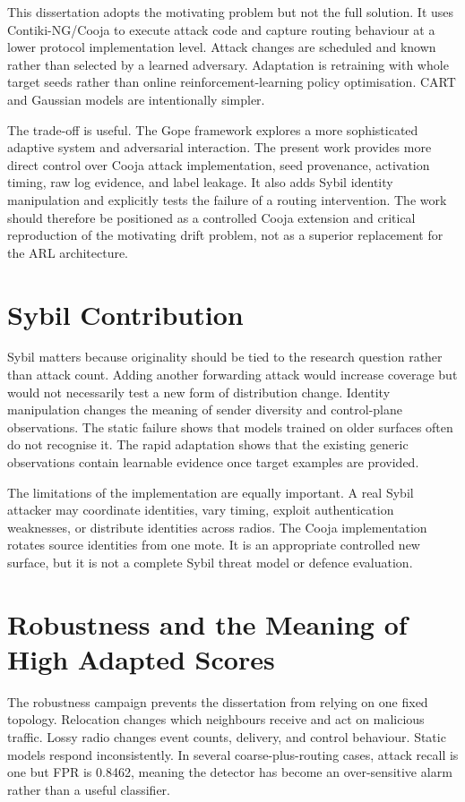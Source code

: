 This dissertation adopts the motivating problem but not the full solution. It uses Contiki-NG/Cooja to execute attack code and capture routing behaviour at a lower protocol implementation level. Attack changes are scheduled and known rather than selected by a learned adversary. Adaptation is retraining with whole target seeds rather than online reinforcement-learning policy optimisation. CART and Gaussian models are intentionally simpler.

The trade-off is useful. The Gope framework explores a more sophisticated adaptive system and adversarial interaction. The present work provides more direct control over Cooja attack implementation, seed provenance, activation timing, raw log evidence, and label leakage. It also adds Sybil identity manipulation and explicitly tests the failure of a routing intervention. The work should therefore be positioned as a controlled Cooja extension and critical reproduction of the motivating drift problem, not as a superior replacement for the ARL architecture.

\section{Sybil Contribution}

Sybil matters because originality should be tied to the research question rather than attack count. Adding another forwarding attack would increase coverage but would not necessarily test a new form of distribution change. Identity manipulation changes the meaning of sender diversity and control-plane observations. The static failure shows that models trained on older surfaces often do not recognise it. The rapid adaptation shows that the existing generic observations contain learnable evidence once target examples are provided.

The limitations of the implementation are equally important. A real Sybil attacker may coordinate identities, vary timing, exploit authentication weaknesses, or distribute identities across radios. The Cooja implementation rotates source identities from one mote. It is an appropriate controlled new surface, but it is not a complete Sybil threat model or defence evaluation.

\section{Robustness and the Meaning of High Adapted Scores}

The robustness campaign prevents the dissertation from relying on one fixed topology. Relocation changes which neighbours receive and act on malicious traffic. Lossy radio changes event counts, delivery, and control behaviour. Static models respond inconsistently. In several coarse-plus-routing cases, attack recall is one but FPR is 0.8462, meaning the detector has become an over-sensitive alarm rather than a useful classifier.


